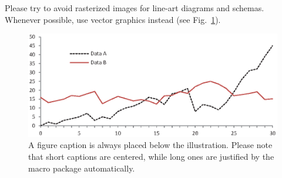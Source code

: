 \documentclass[runningheads]{llncs}
\begin{document}
Please try to avoid rasterized images for line-art diagrams and
schemas. Whenever possible, use vector graphics instead (see
Fig.~\ref{fig1}).

\begin{figure}
\includegraphics[width=\textwidth]{fig1.eps}
\caption{A figure caption is always placed below the illustration.
Please note that short captions are centered, while long ones are
justified by the macro package automatically.} \label{fig1}
\end{figure}
%
%
%
\nocite{*}



%
\end{document}
